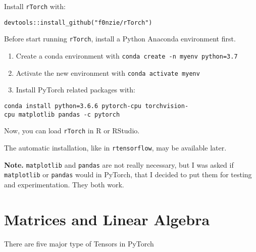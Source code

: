\documentclass[]{book}
\newenvironment{Shaded}{\begin{snugshade}}{\end{snugshade}}
\newcommand{\KeywordTok}[1]{\textcolor[rgb]{0.13,0.29,0.53}{\textbf{#1}}}
\newcommand{\NormalTok}[1]{#1}
\newcommand{\OperatorTok}[1]{\textcolor[rgb]{0.81,0.36,0.00}{\textbf{#1}}}
\newcommand{\StringTok}[1]{\textcolor[rgb]{0.31,0.60,0.02}{#1}}
\begin{document}
Install \texttt{rTorch} with:

\texttt{devtools::install\_github("f0nzie/rTorch")}

Before start running \texttt{rTorch}, install a Python Anaconda environment first.

\begin{enumerate}
\def\labelenumi{\arabic{enumi}.}
\item
  Create a conda environment with \texttt{conda\ create\ -n\ myenv\ python=3.7}
\item
  Activate the new environment with \texttt{conda\ activate\ myenv}
\item
  Install PyTorch related packages with:
\end{enumerate}

\texttt{conda\ install\ python=3.6.6\ pytorch-cpu\ torchvision-cpu\ matplotlib\ pandas\ -c\ pytorch}

Now, you can load \texttt{rTorch} in R or RStudio.

The automatic installation, like in \texttt{rtensorflow}, may be available later.

\textbf{Note.} \texttt{matplotlib} and \texttt{pandas} are not really necessary, but I was asked if \texttt{matplotlib} or \texttt{pandas} would in PyTorch, that I decided to put them for testing and experimentation. They both work.

\hypertarget{matrices-and-linear-algebra}{%
\section{Matrices and Linear Algebra}\label{matrices-and-linear-algebra}}

There are five major type of Tensors in PyTorch

\begin{Shaded}
\end{Shaded}
\end{document}
